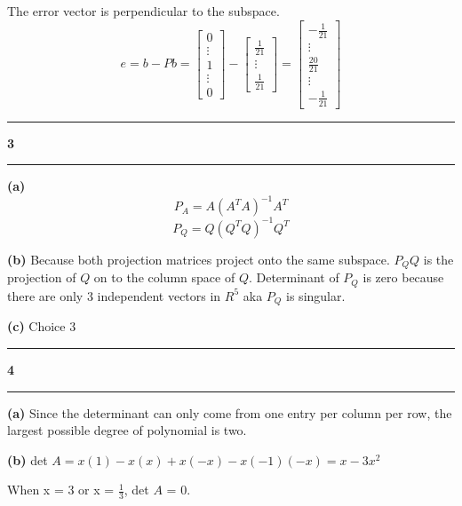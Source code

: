 \documentclass[11pt]{article}
\newcommand\question[2]{\vspace{.25in}\hrule\textbf{#1 #2}\vspace{.5em}\hrule\vspace{.10in}}
\renewcommand\part[1]{\vspace{.10in}\textbf{(#1)}}
\begin{document}
The error vector is perpendicular to the subspace. 
$$e = b - Pb = \begin{bmatrix} 0 \\ \vdots \\ 1 \\ \vdots \\ 0 \end{bmatrix} - \begin{bmatrix} \frac{1}{21} \\ \vdots \\ \frac{1}{21} \end{bmatrix} = \begin{bmatrix} - \frac{1}{21} \\ \vdots \\ \frac{20}{21} \\ \vdots \\ -\frac{1}{21} \end{bmatrix}$$
\question{3}{}
\part{a} 
$$P_A = A(A^TA)^{-1}A^T$$
$$P_Q = Q(Q^TQ)^{-1}Q^T$$

\part{b} Because both projection matrices project onto the same subspace. \(P_QQ\) is the projection of \(Q\) on to the column space of \(Q\). Determinant of \(P_Q\) is zero because there are only 3 independent vectors in \(R^5\) aka \(P_Q\) is singular. 

\part{c} Choice 3

\question{4}{}
\part{a} Since the determinant can only come from one entry per column per row, the largest possible degree of polynomial is two.

\part{b} det \(A = x(1) -x(x) + x(-x) - x (-1) (-x) = x - 3x^2\) 

When x = 3 or x = \(\frac{1}{3}\), det \(A\) = 0.
\end{document}
